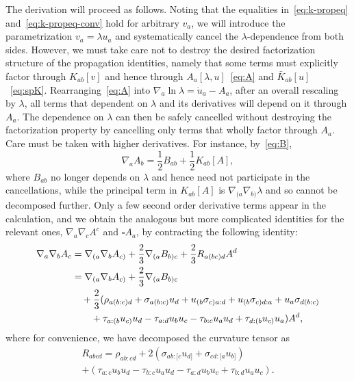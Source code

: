 \documentclass[a4paper]{article}
\theoremstyle{remark}
\newcommand{\la}{\lambda}
\begin{document}
The derivation will proceed as follows. Noting that the equalities
in~\eqref{eq:k-propeq} and~\eqref{eq:k-propeq-conv} hold for arbitrary
$v_a$, we will introduce the parametrization $v_a = \la u_a$ and
systematically cancel the $\la$-dependence from both sides. However, we
must take care not to destroy the desired factorization structure of the
propagation identities, namely that some terms must explicitly factor through $K_{ab}[v]$ and hence through $A_a[\la,u]$~\eqref{eq:A} and
$\bar{K}_{ab}[u]$~\eqref{eq:spK}. Rearranging~\eqref{eq:A} into
$\nabla_a \ln\la = \dot{u}_a - A_a$, after an overall rescaling by
$\lambda$, all terms that dependent on $\la$ and its derivatives will
depend on it through $A_a$. The dependence on $\la$ can then be safely
cancelled without destroying the factorization property by cancelling
only terms that wholly factor through $A_a$. Care must be taken with
higher derivatives. For instance, by~\eqref{eq:B},
\begin{equation}
	\nabla_a A_b = \frac{1}{2} B_{ab} + \frac{1}{2} K_{ab}[A] ,
\end{equation}
where $B_{ab}$ no longer depends on $\la$ and hence need not participate
in the cancellations, while the principal term in $K_{ab}[A]$ is
$\nabla_{(a} \nabla_{b)} \la$ and so cannot be decomposed further. Only
a few second order derivative terms appear in the calculation, and we
obtain the analogous but more complicated identities for the relevant
ones, $\nabla_a \nabla_c A^c$ and $\square A_a$, by contracting the following identity:
\begin{align}
	\notag
	\nabla_a \nabla_b A_c
	&= \nabla_{(a} \nabla_b A_{c)} + \frac{2}{3} \nabla_{(a} B_{b)c}
		+ \frac{2}{3} R_{a(bc)d} A^d
	\\ \notag
	&= \nabla_{(a} \nabla_b A_{c)} + \frac{2}{3} \nabla_{(a} B_{b)c}
	\\ \notag & \quad
	+ \frac{2}{3} (\rho_{a(b:c)d} + \sigma_{a(b:c)} u_d + u_{(b} \sigma_{c)a:d} + u_{(b} \sigma_{c)d:a} + u_a \sigma_{d(b:c)} \notag
	\\ & \qquad
		+ \tau_{a:(b} u_{c)} u_d - \tau_{a:d} u_b u_c - \tau_{b:c} u_a u_d + \tau_{d:(b} u_{c)} u_a) A^d
	, \label{eq:nabla-nabla-A}
\end{align}
where for convenience, we have decomposed the curvature tensor as
\begin{multline}
	R_{abcd}
	= \rho_{ab:cd}
	+ 2(\sigma_{ab:[c} u_{d]} + \sigma_{cd:[a} u_{b]})
	\\
	+ (\tau_{a:c} u_b u_d - \tau_{b:c} u_a u_d
		- \tau_{a:d} u_b u_c + \tau_{b:d} u_a u_c) .
\end{multline}
\end{document}
